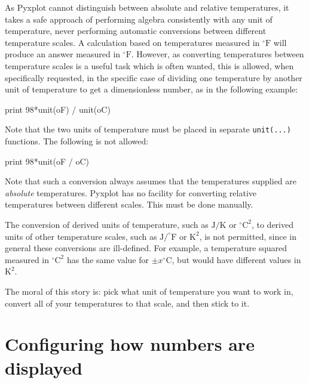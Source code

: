 As Pyxplot cannot distinguish between absolute and relative temperatures, it
takes a safe approach of performing algebra consistently with any unit of
temperature, never performing automatic conversions between different
temperature scales. A calculation based on temperatures measured in
$^\circ\mathrm{F}$ will produce an answer measured in $^\circ\mathrm{F}$.
However, as converting temperatures between temperature scales is a useful task
which is often wanted, this is allowed, when specifically requested, in the
specific case of dividing one temperature by another unit of temperature to get
a dimensionless number, as in the following example:

\begin{dodo}
print 98*unit(oF) / unit(oC)
\end{dodo}

\noindent Note that the two units of temperature must be placed in separate
{\tt unit(...)} functions. The following is not allowed:

\begin{dontdo}
print 98*unit(oF / oC)
\end{dontdo}

Note that such a conversion always assumes that the temperatures supplied are
{\it absolute} temperatures. Pyxplot has no facility for converting relative
temperatures between different scales. This must be done manually.

The conversion of derived units of temperature, such as $\mathrm{J}/\mathrm{K}$ or
$^\circ\mathrm{C}^2$, to derived units of other temperature scales, such as
$\mathrm{J}/^\circ\mathrm{F}$ or $\mathrm{K}^2$, is not permitted, since in
general these conversions are ill-defined. For example, a temperature squared
measured in $^\circ\mathrm{C}^2$ has the same value for $\pm
x^\circ\mathrm{C}$, but would have different values in $\mathrm{K}^2$.

The moral of this story is: pick what unit of temperature you want to work in,
convert all of your temperatures to that scale, and then stick to it.


\section{Configuring how numbers are displayed}
\label{sec:unitdisp}

